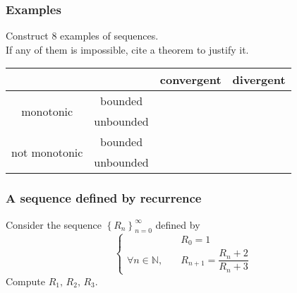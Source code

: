 \documentclass[14pt]{beamer}
\begin{document}
	\begin{frame}[t]
		\fontsize{13}{13}\selectfont
		\frametitle{Examples}

		Construct 8 examples of sequences. \\ If any of them is impossible, cite a theorem
		to justify it.

		\begin{center}
			\begin{tabular}{|c|c|c|c|}
				\hline
				                               &           & convergent                                               & divergent                                                \\
				\hline
				\multirow{2}{*}{monotonic}     & bounded   & \phantom{$\displaystyle \int_{\dfrac 11}^{9}$ ???????? } & \phantom{$\displaystyle \int_{\dfrac 11}^{9}$ ???????? } \\
				\cline{2-4}                    & unbounded & \phantom{$\displaystyle \int_{\dfrac 11}^{9}$ ???????? } & \phantom{$\displaystyle \int_{\dfrac 11}^{9}$ ???????? } \\
				\hline
				\multirow{2}{*}{not monotonic} & bounded   & \phantom{$\displaystyle \int_{\dfrac 11}^{9}$ ???????? } & \phantom{$\displaystyle \int_{\dfrac 11}^{9}$ ???????? } \\
				\cline{2-4}                    & unbounded & \phantom{$\displaystyle \int_{\dfrac 11}^{9}$ ???????? } & \phantom{$\displaystyle \int_{\dfrac 11}^{9}$ ???????? } \\
				\hline
			\end{tabular}
		\end{center}
	\end{frame}

	\begin{frame}[t]
		\frametitle{A sequence defined by recurrence}

		Consider the sequence $\displaystyle \left\{ R_{n} \right\}_{n=0}^{\infty}$
		defined by
		\begin{equation*}
			\begin{cases}
				                                & R_{0}= 1                           \\
				\forall n \in \mathbb{N}, \quad & R_{n+1}= \dfrac{ R_n + 2}{R_n + 3}
			\end{cases}
		\end{equation*}
		Compute $\displaystyle R_{1}, \, R_{2}, \, R_{3}$.
	\end{frame}
\end{document}
